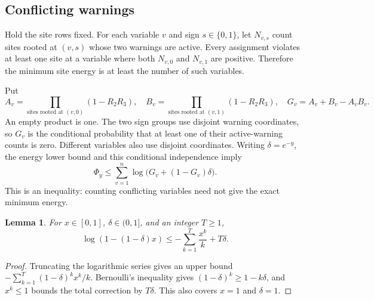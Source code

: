 \documentclass[11pt]{article}
\newtheorem{lemma}[theorem]{Lemma}
\theoremstyle{remark}
\begin{document}
\subsection{Conflicting warnings}
Hold the site rows fixed. For each variable $v$ and sign $s\in\{0,1\}$,
let $N_{v,s}$ count sites rooted at $(v,s)$ whose two warnings are active.
Every assignment violates at least one site at a variable where both
$N_{v,0}$ and $N_{v,1}$ are positive. Therefore the minimum site energy
is at least the number of such variables.

Put
\[
 A_v=\prod_{\text{sites rooted at }(v,0)}(1-R_2R_3),\quad
 B_v=\prod_{\text{sites rooted at }(v,1)}(1-R_2R_3),\quad
 G_v=A_v+B_v-A_vB_v.
\]
An empty product is one. The two sign groups use disjoint warning
coordinates, so $G_v$ is the conditional probability that at least one
of their active-warning counts is zero. Different variables also use
disjoint coordinates. Writing $\delta=e^{-y}$, the energy lower bound and
this conditional independence imply
\begin{equation}\label{eq:vertex}
 \Phi_y\leq\sum_{v=1}^n\log\bigl(G_v+(1-G_v)\delta\bigr).
\end{equation}
This is an inequality: counting conflicting variables need not give the
exact minimum energy.

\begin{lemma}\label{lem:truncate}
For $x\in[0,1]$, $\delta\in(0,1]$, and an integer $T\geq1$,
\begin{equation}\label{eq:truncate}
 \log(1-(1-\delta)x)\leq-\sum_{k=1}^T\frac{x^k}{k}+T\delta.
\end{equation}
\end{lemma}
\begin{proof}
Truncating the logarithmic series gives an upper bound
$-\sum_{k=1}^T(1-\delta)^kx^k/k$. Bernoulli's inequality gives
$(1-\delta)^k\geq1-k\delta$, and $x^k\leq1$ bounds the total correction
by $T\delta$. This also covers $x=1$ and $\delta=1$.
\end{proof}
\end{document}
